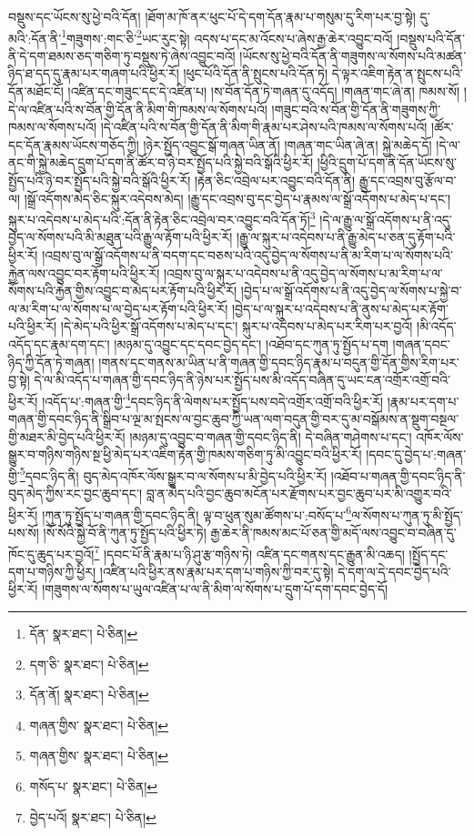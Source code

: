 བསྡུས་དང་ཡོངས་སུ་ཕྱེ་བའི་དོན། །ཐོག་མ་ཁོ་ནར་ཕུང་པོ་དེ་དག་དོན་རྣམ་པ་གསུམ་དུ་རིག་པར་བྱ་སྟེ། དུ་མའི་:དོན་ནི་\footnote{དོན་  སྣར་ཐང་།  པེ་ཅིན། }གཟུགས་:གང་ཅི་\footnote{དག་ཅི་  སྣར་ཐང་།  པེ་ཅིན། }ཡང་རུང་སྟེ། འདས་པ་དང་མ་འོངས་པ་ཞེས་རྒྱ་ཆེར་འབྱུང་བའོ། །བསྡུས་པའི་དོན་ནི་དེ་དག་ཐམས་ཅད་གཅིག་ཏུ་བསྡུས་ཏེ་ཞེས་འབྱུང་བའོ། །ཡོངས་སུ་ཕྱེ་བའི་དོན་ནི་གཟུགས་ལ་སོགས་པའི་མཚན་ཉིད་ཐ་དད་དུ་རྣམ་པར་གཞག་པའི་ཕྱིར་རོ། །ཕུང་པོའི་དོན་ནི་སྤུངས་པའི་དོན་ཏེ། དེ་ལྟར་འཇིག་རྟེན་ན་སྤུངས་པའི་དོན་མཐོང་ངོ། །འཛིན་དང་གཟུང་དང་དེ་འཛིན་པ། །ས་བོན་དོན་ཏེ་གཞན་དུ་འདོད། །གཞན་གང་ཞེ་ན། ཁམས་སོ། །དེ་ལ་འཛིན་པའི་ས་བོན་གྱི་དོན་ནི་མིག་གི་ཁམས་ལ་སོགས་པའོ། །གཟུང་བའི་ས་བོན་གྱི་དོན་ནི་གཟུགས་ཀྱི་ཁམས་ལ་སོགས་པའོ། །དེ་འཛིན་པའི་ས་བོན་གྱི་དོན་ནི་མིག་གི་རྣམ་པར་ཤེས་པའི་ཁམས་ལ་སོགས་པའོ། །ཚོར་དང་དོན་རྣམས་ཡོངས་གཅོད་ཀྱི། །ཉེར་སྤྱོད་འབྱུང་སྒོ་གཞན་ཡིན་ནོ། །གཞན་གང་ཡིན་ཞེ་ན། སྐྱེ་མཆེད་དོ། །དེ་ལ་ནང་གི་སྐྱེ་མཆེད་དྲུག་པོ་དག་ནི་ཚོར་བ་ཉེ་བར་སྤྱོད་པའི་སྐྱེ་བའི་སྒོའི་ཕྱིར་རོ། །ཕྱིའི་དྲུག་པོ་དག་ནི་དོན་ཡོངས་སུ་སྤྱོད་པའི་ཉེ་བར་སྤྱོད་པའི་སྐྱེ་བའི་སྒོའི་ཕྱིར་རོ། །རྟེན་ཅིང་འབྲེལ་པར་འབྱུང་བའི་དོན་ནི། རྒྱུ་དང་འབྲས་བུ་རྩོལ་བ་ལ། །སྒྲོ་འདོགས་མེད་ཅིང་སྐུར་འདེབས་མེད། །རྒྱུ་དང་འབྲས་བུ་དང་བྱེད་པ་རྣམས་ལ་སྒྲོ་འདོགས་པ་མེད་པ་དང་། སྐུར་པ་འདེབས་པ་མེད་པའི་:དོན་ནི་རྟེན་ཅིང་འབྲེལ་བར་འབྱུང་བའི་དོན་ཏོ།\footnote{དོན་ནོ།  སྣར་ཐང་།  པེ་ཅིན། } །དེ་ལ་རྒྱུ་ལ་སྒྲོ་འདོགས་པ་ནི་འདུ་བྱེད་ལ་སོགས་པའི་མི་མཐུན་པའི་རྒྱུ་ལ་རྟོག་པའི་ཕྱིར་རོ། །རྒྱུ་ལ་སྐུར་པ་འདེབས་པ་ནི་རྒྱུ་མེད་པ་ཅན་དུ་རྟོག་པའི་ཕྱིར་རོ། །འབྲས་བུ་ལ་སྒྲོ་འདོགས་པ་ནི་བདག་དང་བཅས་པའི་འདུ་བྱེད་ལ་སོགས་པ་ནི་མ་རིག་པ་ལ་སོགས་པའི་རྐྱེན་ལས་འབྱུང་བར་རྟོག་པའི་ཕྱིར་རོ། །འབྲས་བུ་ལ་སྐུར་པ་འདེབས་པ་ནི་འདུ་བྱེད་ལ་སོགས་པ་མ་རིག་པ་ལ་སོགས་པའི་རྐྱེན་གྱིས་འབྱུང་བ་མེད་པར་རྟོག་པའི་ཕྱིར་རོ། །བྱེད་པ་ལ་སྒྲོ་འདོགས་པ་ནི་འདུ་བྱེད་ལ་སོགས་པ་སྐྱེ་བ་ལ་མ་རིག་པ་ལ་སོགས་པ་ལ་བྱེད་པར་རྟོག་པའི་ཕྱིར་རོ། །བྱེད་པ་ལ་སྐུར་པ་འདེབས་པ་ནི་ནུས་པ་མེད་པར་རྟོག་པའི་ཕྱིར་རོ། །དེ་མེད་པའི་ཕྱིར་སྒྲོ་འདོགས་པ་མེད་པ་དང་། སྐུར་པ་འདེབས་པ་མེད་པར་རིག་པར་བྱའོ། །མི་འདོད་འདོད་དང་རྣམ་དག་དང་། །མཉམ་དུ་འབྱུང་དང་དབང་བྱེད་དང་། །འཐོབ་དང་ཀུན་ཏུ་སྤྱོད་པ་དག །གཞན་དབང་ཉིད་ཀྱི་དོན་ཏེ་གཞན། །གནས་དང་གནས་མ་ཡིན་པ་ནི་གཞན་གྱི་དབང་ཉིད་རྣམ་པ་བདུན་གྱི་དོན་གྱིས་རིག་པར་བྱ་སྟེ། དེ་ལ་མི་འདོད་པ་གཞན་གྱི་དབང་ཉིད་ནི་ཉེས་པར་སྤྱོད་པས་མི་འདོད་བཞིན་དུ་ཡང་ངན་འགྲོར་འགྲོ་བའི་ཕྱིར་རོ། །འདོད་པ་:གཞན་གྱི་\footnote{གཞན་གྱིས་  སྣར་ཐང་།  པེ་ཅིན། }དབང་ཉིད་ནི་ལེགས་པར་སྤྱོད་པས་བདེ་འགྲོར་འགྲོ་བའི་ཕྱིར་རོ། །རྣམ་པར་དག་པ་གཞན་གྱི་དབང་ཉིད་ནི་སྒྲིབ་པ་ལྔ་མ་སྤངས་ལ་བྱང་ཆུབ་ཀྱི་ཡན་ལག་བདུན་གྱི་བར་དུ་མ་བསྒོམས་ན་སྡུག་བསྔལ་གྱི་མཐར་མི་བྱེད་པའི་ཕྱིར་རོ། །མཉམ་དུ་འབྱུང་བ་གཞན་གྱི་དབང་ཉིད་ནི། དེ་བཞིན་གཤེགས་པ་དང་། འཁོར་ལོས་སྒྱུར་བ་གཉིས་གཉིས་སྔ་ཕྱི་མེད་པར་འཇིག་རྟེན་གྱི་ཁམས་གཅིག་ཏུ་མི་འབྱུང་བའི་ཕྱིར་རོ། །དབང་དུ་བྱེད་པ་:གཞན་གྱི་\footnote{གཞན་གྱིས་  སྣར་ཐང་།  པེ་ཅིན། }དབང་ཉིད་ནི། བུད་མེད་འཁོར་ལོས་སྒྱུར་བ་ལ་སོགས་པ་མི་བྱེད་པའི་ཕྱིར་རོ། །འཐོབ་པ་གཞན་གྱི་དབང་ཉིད་ནི་བུད་མེད་ཀྱིས་རང་བྱང་ཆུབ་དང་། བླ་ན་མེད་པའི་བྱང་ཆུབ་མངོན་པར་རྫོགས་པར་བྱང་ཆུབ་པར་མི་འགྱུར་བའི་ཕྱིར་རོ། །ཀུན་ཏུ་སྤྱོད་པ་གཞན་གྱི་དབང་ཉིད་ནི། ལྟ་བ་ཕུན་སུམ་ཚོགས་པ་:བསོད་པ་\footnote{གསོད་པ་  སྣར་ཐང་།  པེ་ཅིན། }ལ་སོགས་པ་ཀུན་ཏུ་མི་སྤྱོད་པས་སོ། །སོ་སོའི་སྐྱེ་བོ་ནི་ཀུན་ཏུ་སྤྱོད་པའི་ཕྱིར་ཏེ། རྒྱ་ཆེར་ནི་ཁམས་མང་པོ་ཅན་གྱི་མདོ་ལས་འབྱུང་བ་བཞིན་དུ་ཁོང་དུ་ཆུད་པར་བྱའོ།\footnote{བྱེད་པའོ།  སྣར་ཐང་།  པེ་ཅིན། } །དབང་པོ་ནི་རྣམ་པ་ཉི་ཤུ་རྩ་གཉིས་ཏེ། འཛིན་དང་གནས་དང་རྒྱུན་མི་འཆད། །སྤྱོད་དང་དག་པ་གཉིས་ཀྱི་ཕྱིར། །འཛིན་པའི་ཕྱིར་ནས་རྣམ་པར་དག་པ་གཉིས་ཀྱི་བར་དུ་སྟེ། དེ་དག་ལ་དེ་དབང་བྱེད་པའི་ཕྱིར་རོ། །གཟུགས་ལ་སོགས་པ་ཡུལ་འཛིན་པ་ལ་ནི་མིག་ལ་སོགས་པ་དྲུག་པོ་དག་དབང་བྱེད་དོ། 